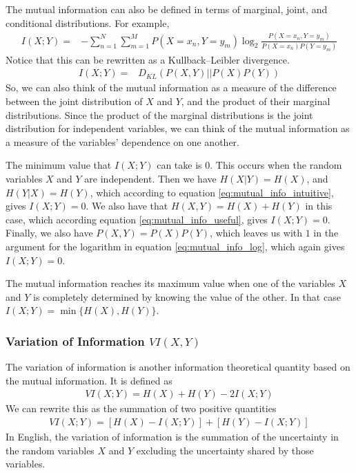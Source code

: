 \documentclass[a4paper,12pt]{article}
\theoremstyle{definition}
\begin{document}
        The mutual information can also be defined in terms of marginal, joint, and conditional distributions. For example,
        \begin{align}\label{eq:mutual_info_log}
            I(X;Y)  =& -\sum_{n=1}^N \sum_{m=1}^M P(X=x_n, Y=y_m) \log _2 \frac{P(X=x_n, Y=y_m)}{P(X=x_n) P(Y=y_m)}
        \end{align}
        Notice that this can be rewritten as a Kullback–Leibler divergence.
        \begin{align}
            I(X;Y)  =& D_{KL}(P(X,Y)|| P(X)P(Y))
        \end{align}
        So, we can also think of the mutual information as a measure of the difference between the joint distribution of $X$ and $Y$, and the product of their marginal distributions. Since the product of the marginal distributions is the joint distribution for independent variables, we can think of the mutual information as a measure of the variables' dependence on one another.

        The minimum value that $I(X;Y)$ can take is $0$. This occurs when the random variables $X$ and $Y$ are independent. Then we have $H(X|Y) = H(X)$, and $H(Y|X) = H(Y)$, which according to equation \ref{eq:mutual_info_intuitive}, gives $I(X;Y) = 0$. We also have that $H(X,Y) = H(X) + H(Y)$ in this case, which according equation \ref{eq:mutual_info_useful}, gives $I(X;Y) = 0$. Finally, we also have $P(X,Y) = P(X)P(Y)$, which leaves us with $1$ in the argument for the logarithm in equation \ref{eq:mutual_info_log}, which again gives $I(X;Y) = 0$.

        The mutual information reaches its maximum value when one of the variables $X$ and $Y$ is completely determined by knowing the value of the other. In that case $I(X;Y) = \min \lbrace H(X), H(Y) \rbrace$.

        \subsubsection{Variation of Information $VI(X,Y)$}\label{sec:variation_of_information}
        The variation of information is another information theoretical quantity based on the mutual information. It is defined as
        \begin{align}\label{eq:variation_of_information}
            VI(X;Y) = H(X) + H(Y) - 2 I(X;Y)
        \end{align}
        We can rewrite this as the summation of two positive quantities
        \begin{align}
            VI(X;Y) = \left[ H(X) - I(X;Y) \right] + \left[ H(Y) - I(X;Y) \right]
        \end{align}
        In English, the variation of information is the summation of the uncertainty in the random variables $X$ and $Y$ excluding the uncertainty shared by those variables.
\end{document}
